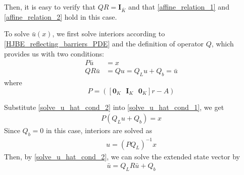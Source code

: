 \documentclass[11pt]{article}
\begin{document}
Then, it is easy to verify that $Q  R = \mathbf{I}_{\bar{K}}$ and that \eqref{affine_relation_1} and \eqref{affine_relation_2} hold in this case.

To solve $\bar{u}(x)$, we first solve interiors according to \eqref{HJBE_reflecting_barriers_PDE} and the definition of operator $Q$, which provides us with two conditions:
\begin{align}
P\bar{u} &= x\label{solve_u_hat_cond_1}\\
Q R\bar{u} &= Q u = Q_L u+Q_b = \bar{u}\label{solve_u_hat_cond_2}
\end{align}
where
\begin{equation}
P = ([\mathbf{0}_{K} \text{ } \mathbf{I}_{K} \text{ } \mathbf{0}_{K}] r - A)
\label{P_definition}
\end{equation}
\iffalse
\begin{align}
P &= \begin{bmatrix}
0&r&0&\cdots&0&0&0\\
0&0&r&\cdots&0&0&0\\
\vdots&\vdots&\vdots&\ddots&\vdots&\vdots&\vdots\\
0&0&0&\cdots&r&0&0\\
0&0&0&\cdots&0&r&0\\
\end{bmatrix}_{K\times\bar{K}}-A  \\
&= \begin{bmatrix}
-1&2(1+r\Delta^2)&-1&\dots&0&0&0\\
0&-1&2(1+r\Delta^2)&\dots&0&0&0\\
\vdots&\vdots&\vdots&\ddots&\vdots&\vdots&\vdots\\
0&0&0&\dots&2(1+r\Delta^2)&-1&0\\
0&0&0&\cdots&-1&2(1+r\Delta^2)&-1
\end{bmatrix}\frac{1}{2\Delta^{2}}
\end{align}
\fi
Substitute \eqref{solve_u_hat_cond_2} into \eqref{solve_u_hat_cond_1}, we get
\begin{align}
P(Q_L u+Q_b) = x
\end{align}
Since $Q_b = 0$ in this case, interiors are solved as
\begin{align}
u = (P Q_L)^{-1}x
\end{align}
Then, by \eqref{solve_u_hat_cond_2}, we can solve the extended state vector by
\begin{align}
\bar{u} = Q_L R\bar{u}+Q_b\label{solve_u_hat_in_terms_of_interiors}
\end{align}
\end{document}
